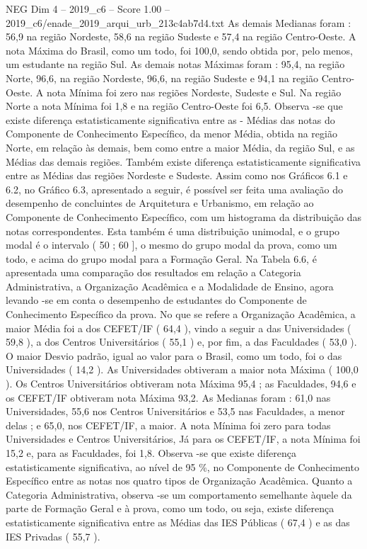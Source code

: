 \begin{textsample}{NEG Dim 4 – 2019\_c6 – Score 1.00 – 2019\_c6/enade\_2019\_arqui\_urb\_213c4ab7d4.txt}
As demais Medianas foram : 56,9 na região Nordeste, 58,6 na região Sudeste e 57,4 na região Centro-Oeste.
A nota Máxima do Brasil, como um todo, foi 100,0, sendo obtida por, pelo menos, um estudante na região Sul.
As demais notas Máximas foram : 95,4, na região Norte, 96,6, na região Nordeste, 96,6, na região Sudeste e 94,1 na região Centro-Oeste.
A nota Mínima foi zero nas regiões Nordeste, Sudeste e Sul.
Na região Norte a nota Mínima foi 1,8 e na região Centro-Oeste foi 6,5.
Observa -se que existe diferença estatisticamente significativa entre as - Médias das notas do Componente de Conhecimento Específico, da menor Média, obtida na região Norte, em relação às demais, bem como entre a maior Média, da região Sul, e as Médias das demais regiões.
Também existe diferença estatisticamente significativa entre as Médias das regiões Nordeste e Sudeste.
Assim como nos Gráficos 6.1 e 6.2, no Gráfico 6.3, apresentado a seguir, é possível ser feita uma avaliação do desempenho de concluintes de Arquitetura e Urbanismo, em relação ao Componente de Conhecimento Específico, com um histograma da distribuição das notas correspondentes.
Esta também é uma distribuição unimodal, e o grupo modal é o intervalo ( 50 ; 60 ], o mesmo do grupo modal da prova, como um todo, e acima do grupo modal para a Formação Geral.
Na Tabela 6.6, é apresentada uma comparação dos resultados em relação a Categoria Administrativa, a Organização Acadêmica e a Modalidade de Ensino, agora levando -se em conta o desempenho de estudantes do Componente de Conhecimento Específico da prova.
No que se refere a Organização Acadêmica, a maior Média foi a dos CEFET/IF ( 64,4 ), vindo a seguir a das Universidades ( 59,8 ), a dos Centros Universitários ( 55,1 ) e, por fim, a das Faculdades ( 53,0 ).
O maior Desvio padrão, igual ao valor para o Brasil, como um todo, foi o das Universidades ( 14,2 ).
As Universidades obtiveram a maior nota Máxima ( 100,0 ).
Os Centros Universitários obtiveram nota Máxima 95,4 ; as Faculdades, 94,6 e os CEFET/IF obtiveram nota Máxima 93,2.
As Medianas foram : 61,0 nas Universidades, 55,6 nos Centros Universitários e 53,5 nas Faculdades, a menor delas ; e 65,0, nos CEFET/IF, a maior.
A nota Mínima foi zero para todas Universidades e Centros Universitários, Já para os CEFET/IF, a nota Mínima foi 15,2 e, para as Faculdades, foi 1,8.
Observa -se que existe diferença estatisticamente significativa, ao nível de 95 \%, no Componente de Conhecimento Específico entre as notas nos quatro tipos de Organização Acadêmica.
Quanto a Categoria Administrativa, observa -se um comportamento semelhante àquele da parte de Formação Geral e à prova, como um todo, ou seja, existe diferença estatisticamente significativa entre as Médias das IES Públicas ( 67,4 ) e as das IES Privadas ( 55,7 ).

\end{textsample}
